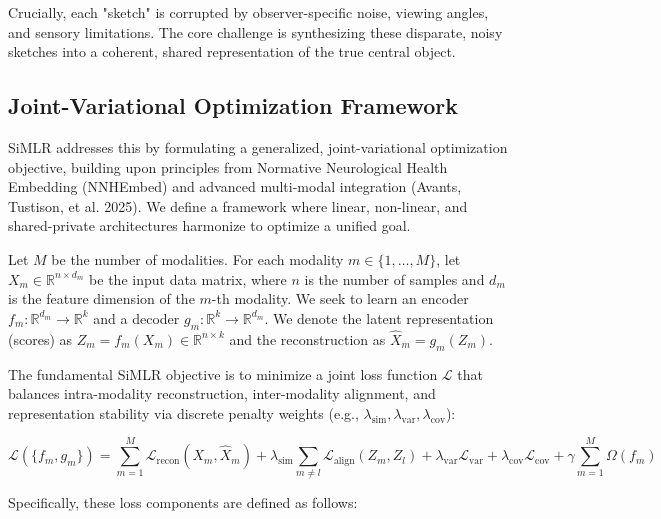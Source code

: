 \documentclass[
  letterpaper,
]{report}
\begin{document}
Crucially, each "sketch" is corrupted by observer-specific noise,
viewing angles, and sensory limitations. The core challenge is
synthesizing these disparate, noisy sketches into a coherent, shared
representation of the true central object.

\subsection{Joint-Variational Optimization
Framework}\label{joint-variational-optimization-framework}

SiMLR addresses this by formulating a generalized, joint-variational
optimization objective, building upon principles from Normative
Neurological Health Embedding (NNHEmbed) and advanced multi-modal
integration ({Avants, Tustison, et al.} 2025). We define a framework
where linear, non-linear, and shared-private architectures harmonize to
optimize a unified goal.

Let \(M\) be the number of modalities. For each modality
\(m \in \{1, \dots, M\}\), let \(X_m \in \mathbb{R}^{n \times d_m}\) be
the input data matrix, where \(n\) is the number of samples and \(d_m\)
is the feature dimension of the \(m\)-th modality. We seek to learn an
encoder \(f_m: \mathbb{R}^{d_m} \to \mathbb{R}^k\) and a decoder
\(g_m: \mathbb{R}^k \to \mathbb{R}^{d_m}\). We denote the latent
representation (scores) as
\(Z_m = f_m(X_m) \in \mathbb{R}^{n \times k}\) and the reconstruction as
\(\hat{X}_m = g_m(Z_m)\).

The fundamental SiMLR objective is to minimize a joint loss function
\(\mathcal{L}\) that balances intra-modality reconstruction,
inter-modality alignment, and representation stability via discrete
penalty weights (e.g.,
\(\lambda_{\text{sim}}, \lambda_{\text{var}}, \lambda_{\text{cov}}\)):

\[
\mathcal{L}(\{f_m, g_m\}) = \sum_{m=1}^M \mathcal{L}_{\text{recon}}(X_m, \hat{X}_m) + \lambda_{\text{sim}} \sum_{m \neq l} \mathcal{L}_{\text{align}}(Z_m, Z_l) + \lambda_{\text{var}} \mathcal{L}_{\text{var}} + \lambda_{\text{cov}} \mathcal{L}_{\text{cov}} + \gamma \sum_{m=1}^M \Omega(f_m)
\]

Specifically, these loss components are defined as follows:
\end{document}
